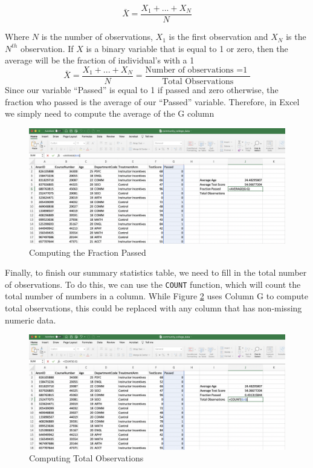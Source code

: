 \documentclass[
]{book}
\begin{document}
\[
  \bar{X} = \frac{X_1 + ... + X_N}{N} 
\]

Where \(N\) is the number of observations, \(X_1\) is the first observation and \(X_N\) is the \(N^{th}\) observation. If \(X\) is a binary variable that is equal to 1 or zero, then the average will be the fraction of individual's with a 1
\[
  \bar{X} = \frac{X_1 + ... + X_N}{N}=\frac{\text{Number of observations =1 }}{\text{Total Observations}} 
\]
Since our variable ``Passed'' is equal to 1 if passed and zero otherwise, the fraction who passed is the average of our ``Passed'' variable. Therefore, in Excel we simply need to compute the average of the G column

\begin{figure}

{\centering \includegraphics[width=1\linewidth]{images/01_frac_passed} 

}

\caption{Computing the Fraction Passed}\label{fig:fracpassed}
\end{figure}

Finally, to finish our summary statistics table, we need to fill in the total number of observations. To do this, we can use the \texttt{COUNT} function, which will count the total number of numbers in a column. While Figure \ref{fig:count} uses Column G to compute total observations, this could be replaced with any column that has non-missing numeric data.

\begin{figure}

{\centering \includegraphics[width=1\linewidth]{images/01_count} 

}

\caption{Computing Total Observations}\label{fig:count}
\end{figure}
\end{document}
